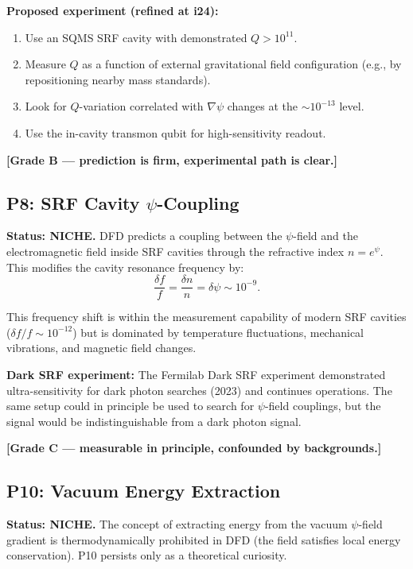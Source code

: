 \documentclass[11pt]{article}
\begin{document}
\textbf{Proposed experiment (refined at i24):}
\begin{enumerate}
  \item Use an SQMS SRF cavity with demonstrated $Q > 10^{11}$.
  \item Measure $Q$ as a function of external gravitational field
    configuration (e.g., by repositioning nearby mass standards).
  \item Look for $Q$-variation correlated with $\nabla\psi$ changes
    at the $\sim 10^{-13}$ level.
  \item Use the in-cavity transmon qubit for high-sensitivity readout.
\end{enumerate}

\textbf{[Grade B --- prediction is firm, experimental path is clear.]}

\subsection{P8: SRF Cavity $\psi$-Coupling}

\textbf{Status: NICHE.} DFD predicts a coupling between the $\psi$-field
and the electromagnetic field inside SRF cavities through the refractive
index $n = e^\psi$. This modifies the cavity resonance frequency by:
\begin{equation}
  \frac{\delta f}{f} = \frac{\delta n}{n} = \delta\psi \sim 10^{-9}.
\end{equation}

This frequency shift is within the measurement capability of modern SRF
cavities ($\delta f/f \sim 10^{-12}$) but is dominated by temperature
fluctuations, mechanical vibrations, and magnetic field changes.

\textbf{Dark SRF experiment:} The Fermilab Dark SRF experiment
demonstrated ultra-sensitivity for dark photon searches (2023) and
continues operations. The same setup could in principle be used to
search for $\psi$-field couplings, but the signal would be
indistinguishable from a dark photon signal.

\textbf{[Grade C --- measurable in principle, confounded by backgrounds.]}

\subsection{P10: Vacuum Energy Extraction}

\textbf{Status: NICHE.} The concept of extracting energy from the
vacuum $\psi$-field gradient is thermodynamically prohibited in DFD
(the field satisfies local energy conservation). P10 persists only as
a theoretical curiosity.
\end{document}
